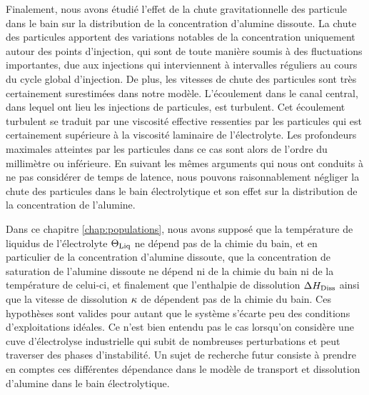 Finalement, nous avons étudié l'effet de la chute gravitationnelle des
particule dans le bain sur la distribution de la concentration
d'alumine dissoute. La chute des particules apportent des variations
notables de la concentration uniquement autour des points d'injection,
qui sont de toute manière soumis à des fluctuations importantes, due
aux injections qui interviennent à intervalles réguliers au cours du
cycle global d'injection. De plus, les vitesses de chute des
particules sont très certainement surestimées dans notre
modèle. L'écoulement dans le canal central, dans lequel ont lieu les
injections de particules, est turbulent. Cet écoulement turbulent se
traduit par une viscosité effective ressenties par les particules qui
est certainement supérieure à la viscosité laminaire de
l'électrolyte. Les profondeurs maximales atteintes par les particules
dans ce cas sont alors de l'ordre du millimètre ou inférieure. En
suivant les mêmes arguments qui nous ont conduits à ne pas considérer
de temps de latence, nous pouvons raisonnablement négliger la chute
des particules dans le bain électrolytique et son effet sur la
distribution de la concentration de l'alumine.

Dans ce chapitre \ref{chap:populations}, nous avons supposé que la
température de liquidus de l'électrolyte $\Theta_\text{Liq}$ ne dépend pas de la
chimie du bain, et en particulier de la concentration d'alumine
dissoute, que la concentration de saturation de l'alumine dissoute ne
dépend ni de la chimie du bain ni de la température de celui-ci, et
finalement que l'enthalpie de dissolution
$\Delta H_\text{Diss}$ ainsi que la vitesse de dissolution
$\kappa$ de dépendent pas de la chimie du bain. Ces
hypothèses sont valides pour autant que le système s'écarte peu des
conditions d'exploitations idéales. Ce n'est bien entendu pas le cas
lorsqu'on considère une cuve d'électrolyse industrielle qui subit de
nombreuses perturbations et peut traverser des phases
d'instabilité. Un sujet de recherche futur consiste à prendre en
comptes ces différentes dépendance dans le modèle de transport et
dissolution d'alumine dans le bain électrolytique.


%
